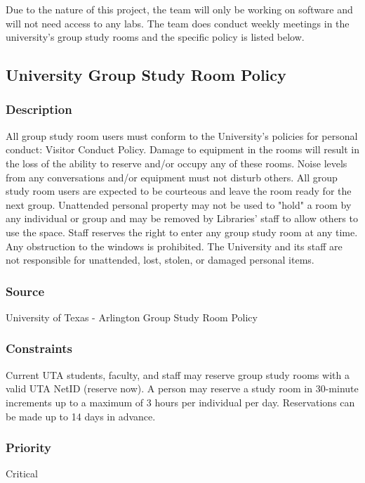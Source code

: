 Due to the nature of this project, the team will only be working on software and will not need access to any labs. The team does conduct weekly meetings in the university's group study rooms and the specific policy is listed below.

\subsection{University Group Study Room Policy}
\subsubsection{Description}
All group study room users must conform to the University's policies for personal conduct: Visitor Conduct Policy. Damage to equipment in the rooms will result in the loss of the ability to reserve and/or occupy any of these rooms. Noise levels from any conversations and/or equipment must not disturb others. All group study room users are expected to be courteous and leave the room ready for the next group. Unattended personal property may not be used to "hold" a room by any individual or group and may be removed by Libraries' staff to allow others to use the space. Staff reserves the right to enter any group study room at any time. Any obstruction to the windows is prohibited. The University and its staff are not responsible for unattended, lost, stolen, or damaged personal items. \cite{UTA}
\subsubsection{Source}
University of Texas - Arlington Group Study Room Policy
\subsubsection{Constraints}
Current UTA students, faculty, and staff may reserve group study rooms with a valid UTA NetID (reserve now). A person may reserve a study room in 30-minute increments up to a maximum of 3 hours per individual per day. Reservations can be made up to 14 days in advance.

\subsubsection{Priority}
Critical
